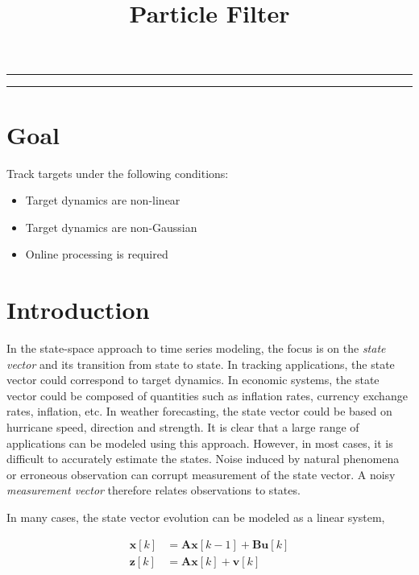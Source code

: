 
\title{Particle Filter}
\date{}

\maketitle
\rule[0pt]{\textwidth}{1pt}
\tableofcontents
\rule[0pt]{\textwidth}{1pt}

\section{Goal}
Track targets under the following conditions:

\begin{itemize}
\item Target dynamics are non-linear
\item Target dynamics are non-Gaussian
\item Online processing is required
\end{itemize}


\section{Introduction}
In the state-space approach to time series modeling, the focus is on the \emph{state vector} and its transition from state to state.  In tracking applications, the state vector could correspond to target dynamics.  In economic systems, the state vector could be composed of quantities such as inflation rates, currency exchange rates, inflation, etc.  In weather forecasting, the state vector could be based on hurricane speed, direction and strength.  It is clear that a large range of applications can be modeled using this approach.  However, in most cases, it is difficult to accurately estimate the states.  Noise induced by natural phenomena or erroneous observation can corrupt measurement of the state vector.  A noisy \emph{measurement vector} therefore relates observations to states.

In many cases, the state vector evolution can be modeled as a linear system,

\begin{align}
\mathbf{x}[k] &= \mathbf{A}\mathbf{x}[k-1] +  \mathbf{B}\mathbf{u}[k]\\
\mathbf{z}[k] &= \mathbf{A}\mathbf{x}[k] +  \mathbf{v}[k]\\
\end{align}

